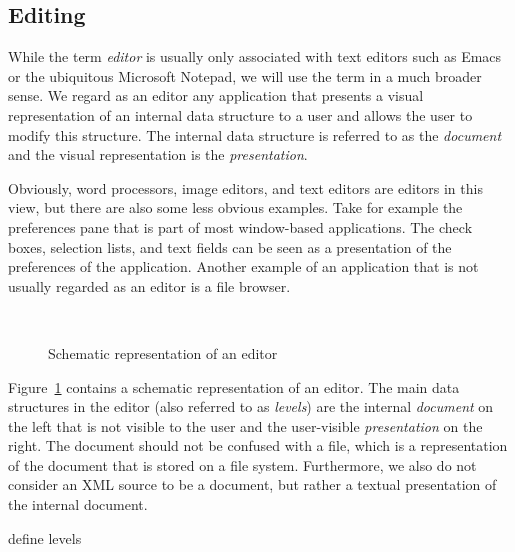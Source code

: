 \subsection{Editing}
\label{sect:editing}


While the term {\em editor} is usually only associated with text editors such as Emacs~\cite{stallman81emacs} or the ubiquitous Microsoft Notepad, we will use the term in a much broader sense. We regard as an editor any application that presents a visual representation of an internal data structure to a user and allows the user to modify this structure. The internal data structure is referred to as the {\em document} and the visual representation is the {\em presentation}. 

Obviously, word processors, image editors, and text editors are editors in this view, but there are also some less obvious examples. Take for example the preferences pane that is part of most window-based applications. The check boxes, selection lists, and text fields can be seen as a presentation of the preferences of the application. Another example of an application that is not usually regarded as an editor is a file browser.


\begin{figure}
\begin{small}
\begin{center}
\begin{center}
~\hspace{1.7cm}
\end{center}\caption{Schematic representation of an editor}\label{editor} 
\end{center}
\end{small}
\end{figure}

Figure~\ref{editor} contains a schematic representation of an editor. The main data structures in the editor (also referred to as {\em levels}) are the internal {\em document} on the left that is not visible to the user and the user-visible {\em presentation} on the right. The document should not be confused with a file, which is a representation of the document that is stored on a file system. Furthermore, we also do not consider an XML source to be a document, but rather a textual presentation of the internal document.

\bc define levels \ec

